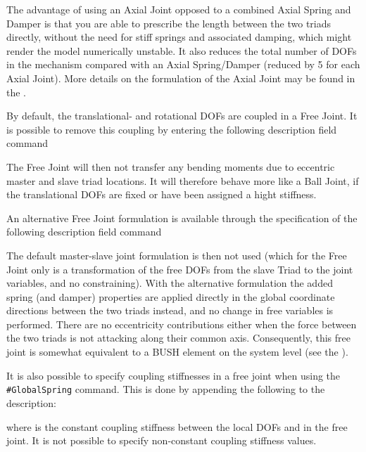 The advantage of using an Axial Joint opposed to a combined Axial Spring
and Damper is that you are able to prescribe the length between the two
triads directly, without the need for stiff springs and associated
damping, which might render the model numerically unstable. It also
reduces the total number of DOFs in the mechanism compared with an Axial
Spring/Damper (reduced by 5 for each Axial Joint). More details on the
formulation of the Axial Joint may be found in the
.



By default, the translational- and rotational DOFs are coupled in a Free Joint.
It is possible to remove this coupling by entering the following description
field command


\noindent
The Free Joint will then not transfer any bending moments due to eccentric
master and slave triad locations.
It will therefore behave more like a Ball Joint, if the translational DOFs
are fixed or have been assigned a hight stiffness.

An alternative Free Joint formulation is available through the
specification of the following description field command


\noindent
The default master-slave joint formulation is then not used (which for
the Free Joint only is a transformation of the free DOFs from the slave
Triad to the joint variables, and no constraining). With the alternative
formulation the added spring (and damper) properties are applied
directly in the global coordinate directions between the two triads
instead, and no change in free variables is performed. There are no
eccentricity contributions either when the force between the two triads
is not attacking along their common axis. Consequently, this free joint
is somewhat equivalent to a BUSH element on the system level (see the
).

It is also possible to specify coupling stiffnesses in a free joint
when using the {\tt\#GlobalSpring} command.
This is done by appending the following to the description:


\noindent
where {\tt{}} is the constant coupling stiffness between
the local DOFs {\tt{}} and {\tt{}} in the free joint.
It is not possible to specify non-constant coupling stiffness values.


